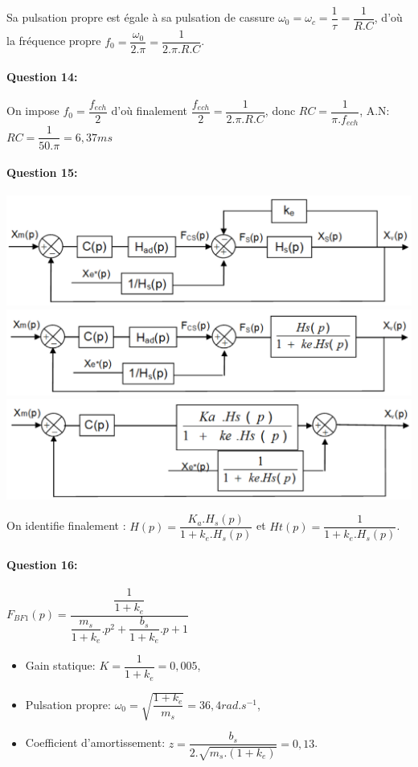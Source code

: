 Sa pulsation propre est égale à sa pulsation de cassure $\omega_0=\omega_c=\dfrac{1}{\tau}=\dfrac{1}{R.C}$, d'où la fréquence propre $f_0=\dfrac{\omega_0}{2.\pi}=\dfrac{1}{2.\pi.R.C}$.

\paragraph{Question 14:}

On impose $f_0=\dfrac{f_{ech}}{2}$ d'où finalement $\dfrac{f_{ech}}{2}=\dfrac{1}{2.\pi.R.C}$, donc $RC=\dfrac{1}{\pi.f_{ech}}$, A.N: $RC=\dfrac{1}{50.\pi}=6,37ms$

\paragraph{Question 15:}

\begin{center}
 \includegraphics[width=0.7\linewidth]{img/sb1} \\
 \includegraphics[width=0.7\linewidth]{img/sb2} \\
 \includegraphics[width=0.7\linewidth]{img/sb3}
\end{center}

On identifie finalement : $H(p)=\dfrac{K_a.H_s(p)}{1+k_e.H_s(p)}$ et $Ht(p)=\dfrac{1}{1+k_e.H_s(p)}$.

\paragraph{Question 16:} $F_{BF1}(p)=\dfrac{\dfrac{1}{1+k_e}}{\dfrac{m_s}{1+k_e}.p^2+\dfrac{b_s}{1+k_e}.p+1}$

\begin{itemize}
 \item Gain statique: $K=\dfrac{1}{1+k_e}=0,005$,
 \item Pulsation propre: $\omega_0=\sqrt{\dfrac{1+k_e}{m_s}}=36,4rad.s^{-1}$,
 \item Coefficient d'amortissement: $z=\dfrac{b_s}{2.\sqrt{m_s.(1+k_e)}}=0,13$.
\end{itemize}

